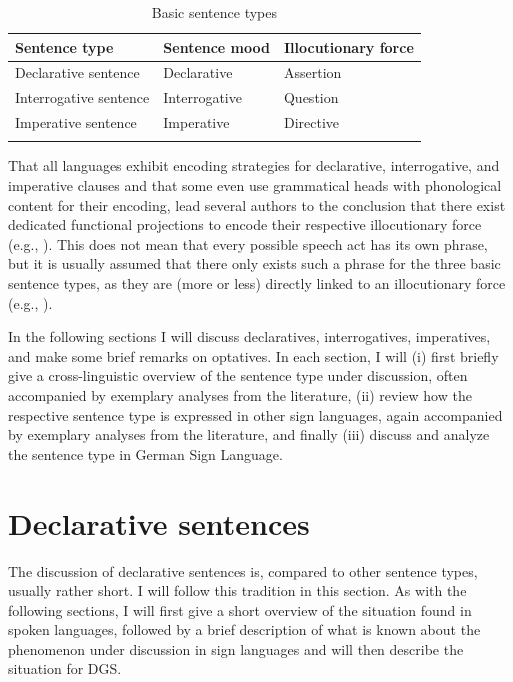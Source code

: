 \begin{table}
\begin{tabular}{lll}
\lsptoprule
Sentence type & Sentence mood & Illocutionary force \\\midrule
Declarative sentence & Declarative & Assertion \\
Interrogative sentence & Interrogative & Question \\
Imperative sentence & Imperative & Directive \\
\lspbottomrule
\end{tabular}
\caption{Basic sentence types\label{basicsentencetypes}}
\end{table}

That all languages exhibit encoding strategies for declarative, interrogative, and imperative clauses and that some even use grammatical heads with phonological content for their encoding, lead several authors to the conclusion that there exist dedicated functional projections to encode their respective illocutionary force (e.g., \citealt{rizzi1997fine, cinque1999adverbs, ambar2003}). This does not mean that every possible speech act has its own phrase, but it is usually assumed that there only exists such a phrase for the three basic sentence types, as they are (more or less) directly linked to an illocutionary force (e.g., \citealt{speas2003configurational}).

In the following sections I will discuss declaratives, interrogatives, imperatives, and make some brief remarks on optatives. In each section, I will (i) first briefly give a cross-linguistic overview of the sentence type under discussion, often accompanied by exemplary analyses from the literature, (ii) review how the respective sentence type is expressed in other sign languages, again accompanied by exemplary analyses from the literature, and finally (iii) discuss and analyze the sentence type in German Sign Language.


\section{Declarative sentences}\label{declarativesentences}
The discussion of declarative sentences is, compared to other sentence types, usually rather short. I will follow this tradition in this section. As with the following sections, I will first give a short overview of the situation found in spoken languages, followed by a brief description of what is known about the phenomenon under discussion in sign languages and will then describe the situation for DGS. 


